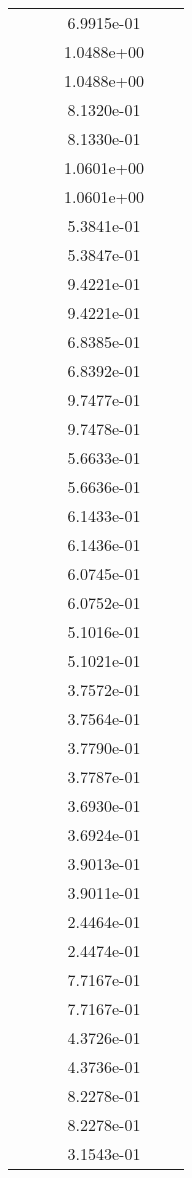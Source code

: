 \begin{xltabular}{\textwidth}{r|rS[table-format=1.3e+2]S[table-format=1.4e+2]S[table-format=1.4e+2]S[table-format=-1.5]}
&  &  & 6.9915e-01 & & \\
&  &  & 1.0488e+00 & & \\
&  &  & 1.0488e+00 & & \\
&  &  & 8.1320e-01 & & \\
&  &  & 8.1330e-01 & & \\
&  &  & 1.0601e+00 & & \\
&  &  & 1.0601e+00 & & \\
&  &  & 5.3841e-01 & & \\
&  &  & 5.3847e-01 & & \\
&  &  & 9.4221e-01 & & \\
&  &  & 9.4221e-01 & & \\
&  &  & 6.8385e-01 & & \\
&  &  & 6.8392e-01 & & \\
&  &  & 9.7477e-01 & & \\
&  &  & 9.7478e-01 & & \\
&  &  & 5.6633e-01 & & \\
&  &  & 5.6636e-01 & & \\
&  &  & 6.1433e-01 & & \\
&  &  & 6.1436e-01 & & \\
&  &  & 6.0745e-01 & & \\
&  &  & 6.0752e-01 & & \\
&  &  & 5.1016e-01 & & \\
&  &  & 5.1021e-01 & & \\
&  &  & 3.7572e-01 & & \\
&  &  & 3.7564e-01 & & \\
&  &  & 3.7790e-01 & & \\
&  &  & 3.7787e-01 & & \\
&  &  & 3.6930e-01 & & \\
&  &  & 3.6924e-01 & & \\
&  &  & 3.9013e-01 & & \\
&  &  & 3.9011e-01 & & \\
&  &  & 2.4464e-01 & & \\
&  &  & 2.4474e-01 & & \\
&  &  & 7.7167e-01 & & \\
&  &  & 7.7167e-01 & & \\
&  &  & 4.3726e-01 & & \\
&  &  & 4.3736e-01 & & \\
&  &  & 8.2278e-01 & & \\
&  &  & 8.2278e-01 & & \\
&  &  & 3.1543e-01 & & \\

\end{xltabular}
